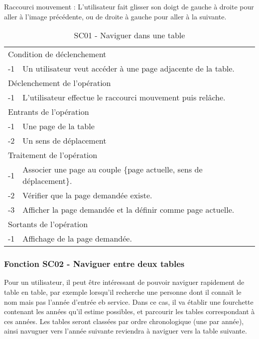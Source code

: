 \documentclass[a4paper]{article}
\begin{document}
Raccourci mouvement : L'utilisateur fait glisser son doigt de gauche \`a droite pour aller \`a l'image pr\'ec\'edente, ou de droite \`a gauche pour aller \`a la suivante.

\begin{table}[H]
  \centering
   \small
	\begin{tabular}{|c|p{12cm}|}
   		\hline
   			\rowcolor{lightgray}\multicolumn{2}{|c|}{\textbf{SC01 - Naviguer dans une m\^eme table}} \\
   		\hline
   			\multicolumn{2}{|l|}{Condition de d\'eclenchement} \\
   		\hline
   		-1 & Un utilisateur veut acc\'eder \`a une page adjacente de la table. \\
   		\hline
   			\multicolumn{2}{|l|}{D\'eclenchement de l'op\'eration} \\
   		\hline
   			-1 & L'utilisateur effectue le raccourci mouvement puis rel\^ache. \\
   		\hline
   			\multicolumn{2}{|l|}{Entrants de l'op\'eration} \\
   		\hline
   			-1 & Une page de la table \\
        	-2 & Un sens de d\'eplacement \\ 
   		\hline
   			\multicolumn{2}{|l|}{Traitement de l'op\'eration} \\
  		\hline
   			-1 & Associer une page au couple \{page actuelle, sens de d\'eplacement\}.  \\
        	-2 & V\'erifier que la page demand\'ee existe. \\
        	-3 & Afficher la page demand\'ee et la d\'efinir comme page actuelle. \\
   		\hline
   			\multicolumn{2}{|l|}{Sortants de l'op\'eration} \\
   		\hline
   			-1 & Affichage de la page demand\'ee. \\
   		\hline
	\end{tabular}
  \caption{SC01 - Naviguer dans une table}
  \normalsize
  \label{tab:naviguer_table_unique}
\end{table}


\subsubsection{Fonction SC02 - Naviguer entre deux tables}

Pour un utilisateur, il peut être intéressant de pouvoir naviguer rapidement de table en table, par exemple lorsqu'il recherche une personne dont il connaït le nom mais pas l'année d'entrée eb service. Dans ce cas, il va établir une fourchette contenant les années qu'il estime possibles, et parcourir les tables correspondant à ces années. Les tables seront classées par ordre chronologique (une par année), ainsi navuguer vers l'année suivante reviendra à naviguer vers la table suivante.
\end{document}
